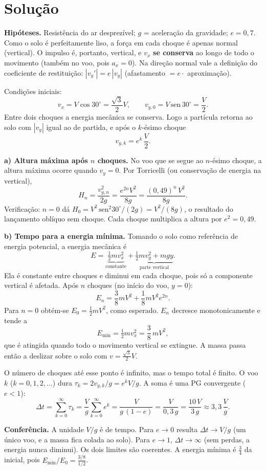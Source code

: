 \documentclass{article}%
\begin{document}
\section*{Solução}

\textbf{Hipóteses.} Resistência do ar desprezível; $g$ = aceleração da gravidade; $e=0{,}7$. Como o solo é perfeitamente liso, a força em cada choque é apenas normal (vertical). O impulso é, portanto, vertical, e $v_x$ \textbf{se conserva} ao longo de todo o movimento (também no voo, pois $a_x=0$). Na direção normal vale a definição do coeficiente de restituição: $|v_y'|=e\,|v_y|$ (afastamento $=e\cdot$ aproximação).

Condições iniciais:
\[
v_x=V\cos30^\circ=\frac{\sqrt3}{2}V,\qquad v_{y,0}=V\,\mathrm{sen}\,30^\circ=\frac V2 .
\]
Entre dois choques a energia mecânica se conserva. Logo a partícula retorna ao solo com $|v_y|$ igual ao de partida, e após o $k$-ésimo choque
\[
v_{y,k}=e^{k}\,\frac V2 .
\]

\textbf{a) Altura máxima após $n$ choques.} No voo que se segue ao $n$-ésimo choque, a altura máxima ocorre quando $v_y=0$. Por Torricelli (ou conservação de energia na vertical),
\[
H_n=\frac{v_{y,n}^2}{2g}=\frac{e^{2n}V^2}{8g}
=\frac{(0{,}49)^{n}\,V^2}{8g}.
\]
Verificação: $n=0$ dá $H_0=V^2\,\mathrm{sen}^2 30^\circ/(2g)=V^2/(8g)$, o resultado do lançamento oblíquo sem choque. Cada choque multiplica a altura por $e^2=0{,}49$.

\textbf{b) Tempo para a energia mínima.} Tomando o solo como referência de energia potencial, a energia mecânica é
\[
E=\underbrace{\tfrac12 m v_x^2}_{\text{constante}}+\underbrace{\tfrac12 m v_y^2+mgy}_{\text{parte vertical}} .
\]
Ela é constante entre choques e diminui em cada choque, pois só a componente vertical é afetada. Após $n$ choques (no início do voo, $y=0$):
\[
E_n=\frac38 mV^2+\frac18 mV^2e^{2n}.
\]
Para $n=0$ obtém-se $E_0=\tfrac12 mV^2$, como esperado. $E_n$ decresce monotonicamente e tende a
\[
E_{\min}=\tfrac12 m v_x^2=\frac38\,mV^2 ,
\]
que é atingida quando todo o movimento vertical se extingue. A massa passa então a deslizar sobre o solo com $v=\frac{\sqrt3}{2}V$.

O número de choques até esse ponto é infinito, mas o tempo total é finito. O voo $k$ ($k=0,1,2,\dots$) dura $\tau_k=2v_{y,k}/g=e^{k}V/g$. A soma é uma PG convergente ($e<1$):
\[
\Delta t=\sum_{k=0}^{\infty}\tau_k=\frac Vg\sum_{k=0}^{\infty}e^{k}=\frac{V}{g\,(1-e)}=\frac{V}{0{,}3\,g}=\frac{10\,V}{3\,g}\approx 3{,}3\,\frac Vg .
\]

\textbf{Conferência.} A unidade $V/g$ é de tempo. Para $e\to0$ resulta $\Delta t\to V/g$ (um único voo, e a massa fica colada ao solo). Para $e\to1$, $\Delta t\to\infty$ (sem perdas, a energia nunca diminui). Os dois limites são coerentes. A energia mínima é $\frac34$ da inicial, pois $E_{\min}/E_0=\frac{3/8}{1/2}$.
\end{document}
